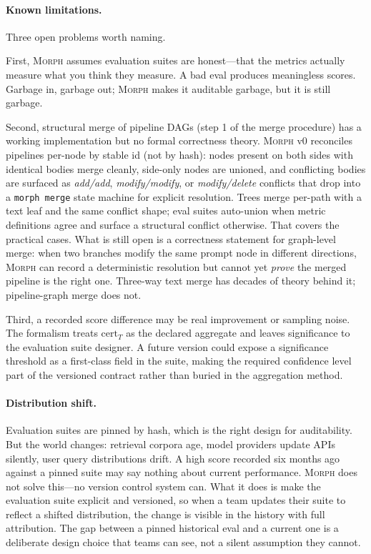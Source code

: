 \documentclass{article}
\begin{document}
\paragraph{Known limitations.}
Three open problems worth naming.

First, \textsc{Morph} assumes evaluation suites are honest---that the metrics
actually measure what you think they measure. A bad eval produces meaningless
scores. Garbage in, garbage out; \textsc{Morph} makes it auditable garbage,
but it is still garbage.

Second, structural merge of pipeline DAGs (step 1 of the merge procedure)
has a working implementation but no formal correctness theory.
\textsc{Morph} v0 reconciles pipelines per-node by stable id (not by
hash): nodes present on both sides with identical bodies merge cleanly,
side-only nodes are unioned, and conflicting bodies are surfaced as
\textit{add/add}, \textit{modify/modify}, or \textit{modify/delete}
conflicts that drop into a \texttt{morph merge} state machine for
explicit resolution. Trees merge per-path with a text leaf and the same
conflict shape; eval suites auto-union when metric definitions agree and
surface a structural conflict otherwise. That covers the practical cases.
What is still open is a correctness statement for graph-level merge:
when two branches modify the same prompt node in different directions,
\textsc{Morph} can record a deterministic resolution but cannot yet
\emph{prove} the merged pipeline is the right one. Three-way text merge
has decades of theory behind it; pipeline-graph merge does not.

Third, a recorded score difference may be real improvement or sampling noise.
The formalism treats $\text{cert}_T$ as the declared aggregate and leaves
significance to the evaluation suite designer. A future version could expose
a significance threshold as a first-class field in the suite, making the
required confidence level part of the versioned contract rather than buried
in the aggregation method.

\paragraph{Distribution shift.}
Evaluation suites are pinned by hash, which is the right design for
auditability. But the world changes: retrieval corpora age, model providers
update APIs silently, user query distributions drift. A high score recorded
six months ago against a pinned suite may say nothing about current
performance. \textsc{Morph} does not solve this---no version control system
can. What it does is make the evaluation suite explicit and versioned, so
when a team updates their suite to reflect a shifted distribution, the change
is visible in the history with full attribution. The gap between a pinned
historical eval and a current one is a deliberate design choice that teams
can see, not a silent assumption they cannot.
\end{document}
